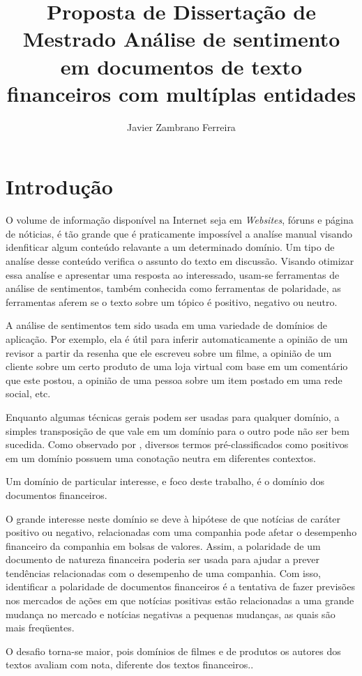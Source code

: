 \documentclass[a4paper,12pt]{article}
\title{\textbf{Proposta de Dissertação de Mestrado}
Análise de sentimento em documentos de texto financeiros com multíplas entidades}
\author{Javier Zambrano Ferreira}
\begin{document}
 

\section{Introdução}

O volume de informação disponível na Internet seja em \textit{Websites}, fóruns e página de nóticias, é tão grande que é praticamente impossível a analíse manual visando idenfiticar algum conteúdo relavante a um determinado domínio. Um tipo de analíse desse conteúdo verifica o assunto do texto em discussão. Visando otimizar essa analíse e apresentar uma resposta ao interessado, usam-se ferramentas de análise de sentimentos, também conhecida como ferramentas de polaridade, as ferramentas aferem se o texto sobre um tópico é positivo, negativo ou neutro.

A análise de sentimentos tem sido usada em uma variedade de domínios de aplicação. Por exemplo, ela é útil para inferir automaticamente a opinião de um revisor a partir da resenha que ele escreveu sobre um filme, a opinião de um cliente sobre um certo produto de uma loja virtual com base em um comentário que este postou, a opinião de uma pessoa sobre um item postado em uma rede social, etc.

Enquanto algumas técnicas gerais podem ser usadas para qualquer domínio, a simples transposição de que vale em um domínio para o outro pode não ser bem sucedida. Como observado por \cite{contextualpolarity}, diversos termos pré-classificados como positivos em um domínio possuem uma conotação neutra em diferentes contextos.

Um domínio de particular interesse, e foco deste trabalho, é o domínio dos documentos financeiros.

O grande interesse neste domínio se deve à hipótese de que notícias de caráter positivo ou negativo, relacionadas com uma companhia pode afetar o desempenho financeiro da companhia em bolsas de valores. Assim, a polaridade de um documento de natureza financeira poderia ser usada para ajudar a prever tendências relacionadas com o desempenho de uma companhia. Com isso, identificar a polaridade de documentos financeiros é a tentativa de fazer previsões nos mercados de ações \cite{pablotese,jbhx,lexiconAA,cohesion} em que notícias positivas estão relacionadas a uma grande mudança no mercado e notícias negativas a pequenas mudanças, as quais são mais freqüentes.

O desafio torna-se maior, pois domínios de filmes e de produtos os autores dos textos avaliam com nota, diferente dos textos financeiros.\cite{pablotese}.
\end{document}

